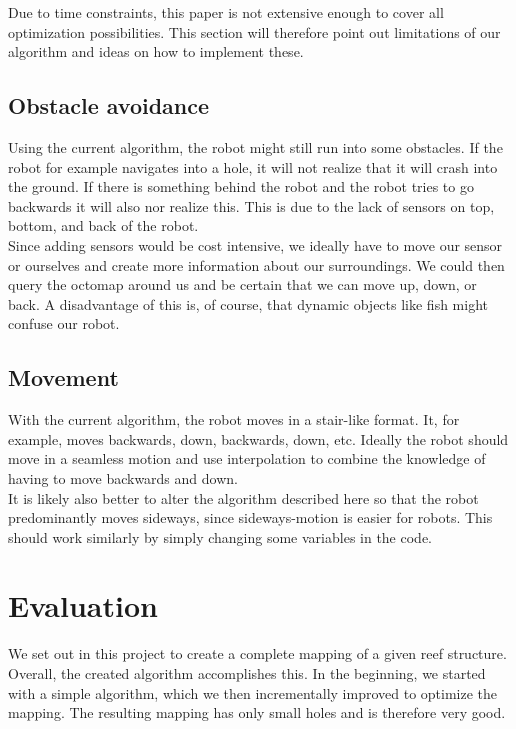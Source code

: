 \documentclass[twoside, 12pt]{article}
\begin{document}
Due to time constraints, this paper is not extensive enough to cover all optimization possibilities. This section will therefore point out limitations of our algorithm and ideas on how to implement these.

\subsection{Obstacle avoidance}
Using the current algorithm, the robot might still run into some obstacles. If the robot for example navigates into a hole, it will not realize that it will crash into the ground. If there is something behind the robot and the robot tries to go backwards it will also nor realize this. This is due to the lack of sensors on top, bottom, and back of the robot.\\

Since adding sensors would be cost intensive, we ideally have to move our sensor or ourselves and create more information about our surroundings. We could then query the octomap around us and be certain that we can move up, down, or back. A disadvantage of this is, of course, that dynamic objects like fish might confuse our robot.\\

\subsection{Movement}
With the current algorithm, the robot moves in a stair-like format. It, for example, moves backwards, down, backwards, down, etc. Ideally the robot should move in a seamless motion and use interpolation to combine the knowledge of having to move backwards and down.\\

It is likely also better to alter the algorithm described here so that the robot predominantly moves sideways, since sideways-motion is easier for robots. This should work similarly by simply changing some variables in the code.\\ 

\section{Evaluation}
\label{sec:eval}

We set out in this project to create a complete mapping of a given reef structure. Overall, the created algorithm accomplishes this. In the beginning, we started with a simple algorithm, which we then incrementally improved to optimize the mapping. The resulting mapping has only small holes and is therefore very good.\\
\end{document}
